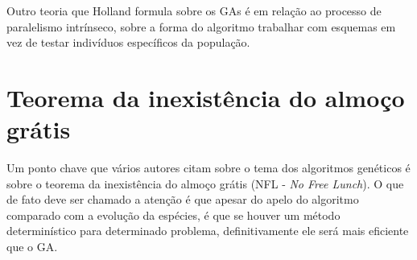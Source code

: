 Outro teoria que Holland formula sobre os GAs é em relação ao processo de paralelismo intrínseco, sobre a forma do algoritmo trabalhar com esquemas em vez de testar indivíduos específicos da população. 

\section {Teorema da inexistência do almoço grátis}
Um ponto chave que vários autores citam sobre o tema dos algoritmos genéticos é sobre o teorema da inexistência do almoço grátis (NFL - \textit{No Free Lunch}). O que de fato deve ser chamado a atenção é que apesar do apelo do algoritmo comparado com a evolução da espécies, é que se houver um método determinístico para determinado problema, definitivamente ele será mais eficiente que o GA. 
